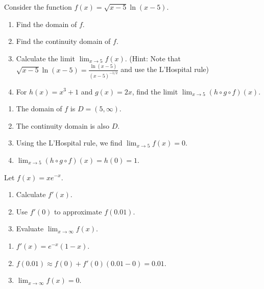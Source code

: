\documentclass[11pt]{exam}
\begin{document}
\begin{questions}

\question[3]
    Consider the function $f(x) = \sqrt{x - 5}\ln(x - 5)$.
    \begin{enumerate}[leftmargin = 0.5cm, label = (\alph*), rightmargin = 0.2cm]
        \item Find the domain of $f$.
        \item Find the continuity domain of $f$.
        \item Calculate the limit $\lim_{x\rightarrow 5} f(x)$. (Hint: Note that $\sqrt{x - 5}\ln(x - 5) = \frac{\ln(x - 5)}{(x - 5)^{-1/2}}$ and use the L'Hospital rule)
        \item For $h(x) = x^3 + 1$ and $g(x) = 2x$, find the limit $\lim_{x\rightarrow 5} (h \circ g \circ f)(x)$.
    \end{enumerate}

\begin{solution}[0cm]
    \begin{enumerate}[leftmargin = 0.5cm, label = (\alph*), rightmargin = 0.2cm]
        \item The domain of $f$ is $D = (5, \infty)$.
        \item The continuity domain is also $D$.
        \item Using the L'Hospital rule, we find $\lim_{x\rightarrow 5} f(x) = 0$.
        \item $\lim_{x\rightarrow 5} (h \circ g \circ f)(x) = h(0) = 1$.
    \end{enumerate}
\end{solution}

\question[3]
    Let $f(x) = xe^{-x}$.
    \begin{enumerate}[leftmargin = 0.5cm, label = (\alph*), rightmargin = 0.2cm]
        \item Calculate $f'(x)$.
        \item Use $f'(0)$ to approximate $f(0.01)$.
        \item Evaluate $\lim_{x \rightarrow \infty} f(x)$.
    \end{enumerate}

\begin{solution}[0cm]
    \begin{enumerate}[leftmargin = 0.5cm, label = (\alph*), rightmargin = 0.2cm]
        \item $f'(x) = e^{-x}(1 - x)$.
        \item $f(0.01) \approx f(0) + f'(0)(0.01 - 0) = 0.01$.
        \item $\lim_{x \to \infty} f(x) = 0$.
    \end{enumerate}
\end{solution}


\end{questions}
\end{document}
